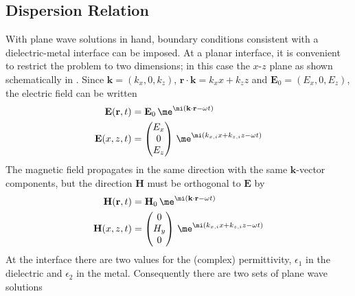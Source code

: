 \subsection{Dispersion Relation}
With plane wave solutions in hand, boundary conditions consistent with a
dielectric-metal interface can be imposed.
At a planar interface, it is convenient to restrict the problem to two
dimensions; in this case the $x$-$z$ plane as shown schematically in
.  Since $\mathbf{k}=(k_x,0,k_z)$,
$\mathbf{r}\cdot\mathbf{k}=k_x x + k_z z$ and $\mathbf{E}_0 = (E_x, 0,
E_z)$, the electric field can be written 
\begin{align}
\mathbf{E} ( \mathbf{r}, t ) &= \mathbf{E}_0\, \me^{\mi (\mathbf{k}
\cdot \mathbf{r} - \omega t )}\\
\mathbf{E}(x,z,t)&=\begin{pmatrix}
E_x\\ 0\\ E_z
\end{pmatrix}
\, \me^{\mi(k_{x,i}x+k_{z,i}z-\omega t)}
\label{eqn:planewavexz}
\end{align}
The magnetic field propagates in the same direction with the
same $\mathbf{k}$-vector components, but the direction
$\mathbf{H}$ must be orthogonal to $\mathbf{E}$ by
\begin{align}
\mathbf{H} ( \mathbf{r}, t ) &= \mathbf{H}_0\, \me^{\mi (\mathbf{k}
\cdot \mathbf{r} - \omega t )}\\
\mathbf{H}(x,z,t)&=\begin{pmatrix}
0\\ H_y\\ 0
\end{pmatrix}
\, \me^{\mi(k_{x,i}x+k_{z,i}z-\omega t)}
\end{align}
At the interface there are two values for the (complex) permittivity,
$\epsilon_1$ in the dielectric and $\epsilon_2$ in the metal.  Consequently
there are two sets of plane wave solutions
